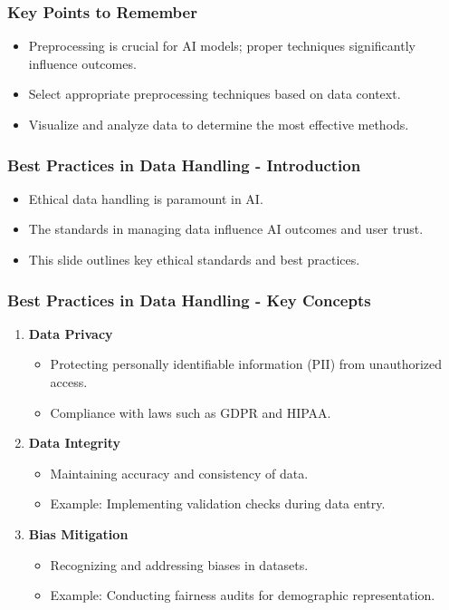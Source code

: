 \documentclass[aspectratio=169]{beamer}
\begin{document}
\begin{frame}
    \frametitle{Key Points to Remember}
    \begin{itemize}
        \item Preprocessing is crucial for AI models; proper techniques significantly influence outcomes.
        \item Select appropriate preprocessing techniques based on data context.
        \item Visualize and analyze data to determine the most effective methods.
    \end{itemize}
\end{frame}

\begin{frame}[fragile]
    \frametitle{Best Practices in Data Handling - Introduction}
    \begin{itemize}
        \item Ethical data handling is paramount in AI.
        \item The standards in managing data influence AI outcomes and user trust.
        \item This slide outlines key ethical standards and best practices.
    \end{itemize}
\end{frame}

\begin{frame}[fragile]
    \frametitle{Best Practices in Data Handling - Key Concepts}
    \begin{enumerate}
        \item \textbf{Data Privacy}
            \begin{itemize}
                \item Protecting personally identifiable information (PII) from unauthorized access.
                \item Compliance with laws such as GDPR and HIPAA.
            \end{itemize}
        \item \textbf{Data Integrity}
            \begin{itemize}
                \item Maintaining accuracy and consistency of data.
                \item Example: Implementing validation checks during data entry.
            \end{itemize}
        \item \textbf{Bias Mitigation}
            \begin{itemize}
                \item Recognizing and addressing biases in datasets.
                \item Example: Conducting fairness audits for demographic representation.
            \end{itemize}
    \end{enumerate}
\end{frame}
\end{document}
